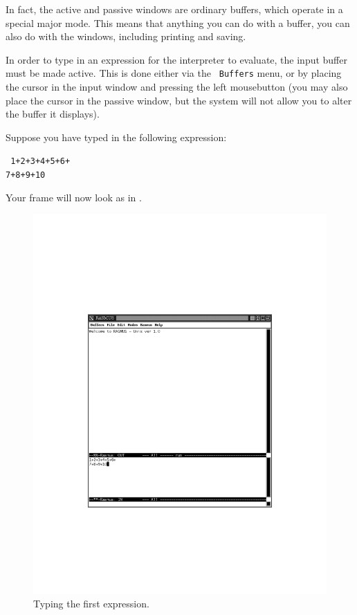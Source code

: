 In fact, the active and passive windows are ordinary \EMACS{} buffers,
which operate in a special \RAS{} major mode. This means that anything
you can do with a buffer, you can also do with the \RAS{} windows,
including printing and saving.

In order to type in an expression for the interpreter to evaluate, the
input buffer must be made active. This is done either via the {\tt
  Buffers} menu, or by placing the cursor in the input window and
pressing the left mousebutton (you may also place the cursor in the
passive window, but the system will not allow you to alter the buffer
it displays).

Suppose you have typed in the following expression:
\begin{center}
\parbox{10em}{\tt
1+2+3+4+5+6+\\
7+8+9+10}
\end{center}
Your \RAS{} frame will now look as in .
\begin{figure}[p]
\centerline{\includegraphics[]{rasfig-firstexp.pdf}}
\caption{Typing the first expression.}
\label{anexpininterpreter}
\end{figure}
